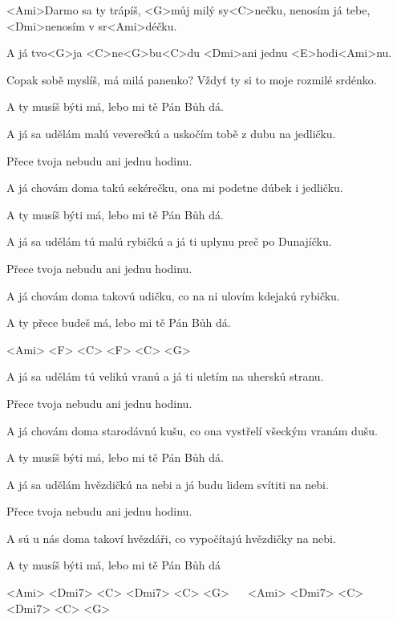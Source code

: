 

\zs
<Ami>Darmo sa ty trápíš, <G>můj milý sy<C>nečku, nenosím já tebe, <Dmi>nenosím v sr<Ami>déčku.

A já tvo<G>ja <C>ne<G>bu<C>du <Dmi>ani jednu <E>hodi<Ami>nu.
\ks

\zs
Copak sobě myslíš, má milá panenko? Vždyť ty si to moje rozmilé srdénko.

A ty musíš býti má, lebo mi tě Pán Bůh dá.
\ks

\zs
A já sa udělám malú veverečkú a uskočím tobě z dubu na jedličku.

Přece tvoja nebudu ani jednu hodinu.
\ks

\zs
A já chovám doma takú sekérečku, ona mi podetne dúbek i jedličku.

A ty musíš býti má, lebo mi tě Pán Bůh dá.
\ks

\zs
A já sa udělám tú malú rybičkú a já ti uplynu preč po Dunajíčku.

Přece tvoja nebudu ani jednu hodinu.
\ks

\zs
A já chovám doma takovú udičku, co na ni ulovím kdejakú rybičku.

A ty přece budeš má, lebo mi tě Pán Bůh dá.
\ks

\zr
<Ami> <F> <C> <F> <C> <G>
\kr

\zs
A já sa udělám tú velikú vranú a já ti uletím na uherskú stranu.

Přece tvoja nebudu ani jednu hodinu.
\ks

\zs
A já chovám doma starodávnú kušu, co ona vystřelí všeckým vranám dušu.

A ty musíš býti má, lebo mi tě Pán Bůh dá.
\ks

\zs
A já sa udělám hvězdičkú na nebi a já budu lidem svítiti na nebi.

Přece tvoja nebudu ani jednu hodinu.
\ks

\zs
A sú u nás doma takoví hvězdáři, co vypočítajú hvězdičky na nebi.

A ty musíš býti má, lebo mi tě Pán Bůh dá
\ks

\zr
<Ami> <Dmi7> <C> <Dmi7> <C> <G> ~~
<Ami> <Dmi7> <C> <Dmi7> <C> <G>
\kr

\kp
